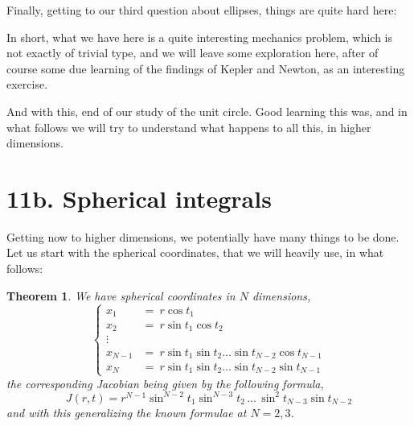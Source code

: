 \documentclass[12pt]{amsbook}
\newtheorem{theorem}{Theorem}[chapter]
\newtheorem{comment}[theorem]{Comment}
\begin{document}
Finally, getting to our third question about ellipses, things are quite hard here:

In short, what we have here is a quite interesting mechanics problem, which is not exactly of trivial type, and we will leave some exploration here, after of course some due learning of the findings of Kepler and Newton, as an interesting exercise.

\bigskip

And with this, end of our study of the unit circle. Good learning this was, and in what follows we will try to understand what happens to all this, in higher dimensions.

\section*{11b. Spherical integrals}

Getting now to higher dimensions, we potentially have many things to be done. Let us start with the spherical coordinates, that we will heavily use, in what follows:


\begin{theorem}
We have spherical coordinates in $N$ dimensions,
$$\begin{cases}
x_1\!\!\!&=\ r\cos t_1\\
x_2\!\!\!&=\ r\sin t_1\cos t_2\\
\vdots\\
x_{N-1}\!\!\!&=\ r\sin t_1\sin t_2\ldots\sin t_{N-2}\cos t_{N-1}\\
x_N\!\!\!&=\ r\sin t_1\sin t_2\ldots\sin t_{N-2}\sin t_{N-1}
\end{cases}$$
the corresponding Jacobian being given by the following formula,
$$J(r,t)=r^{N-1}\sin^{N-2}t_1\sin^{N-3}t_2\,\ldots\,\sin^2t_{N-3}\sin t_{N-2}$$
and with this generalizing the known formulae at $N=2,3$.
\end{theorem}
\end{document}
